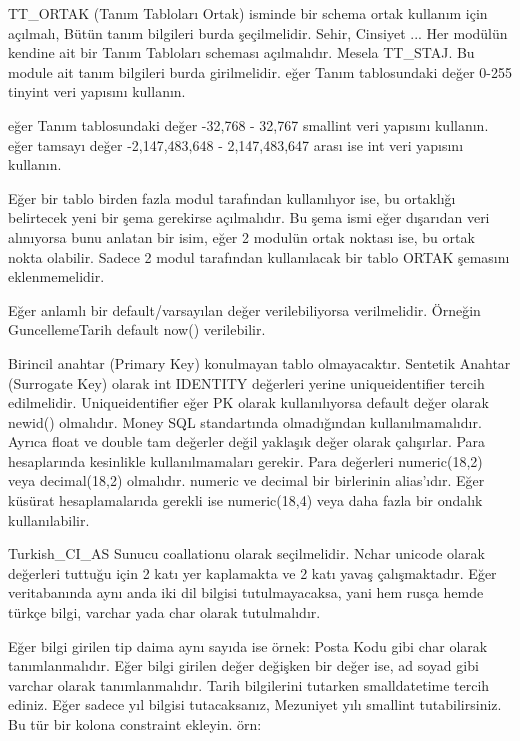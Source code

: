 \documentclass[10pt,a4paper]{article}
\begin{document}
  			TT\_ORTAK  (Tanım Tabloları Ortak) isminde bir schema ortak kullanım 
  için açılmalı, Bütün tanım bilgileri burda şeçilmelidir. 			Sehir, Cinsiyet 
  ...		 
  			Her modülün kendine ait bir Tanım Tabloları scheması açılmalıdır. 
  Mesela TT\_STAJ. Bu module ait tanım bilgileri burda girilmelidir. 		 
   eğer Tanım tablosundaki değer 0-255  tinyint veri yapısını kullanın.
  		 
   eğer Tanım tablosundaki değer  -32,768 - 32,767   smallint veri yapısını 
  kullanın.		 
   eğer tamsayı değer  -2,147,483,648 - 2,147,483,647 arası ise int veri 
  yapısını kullanın.		 
  
  
  			Eğer bir tablo birden fazla modul tarafından kullanılıyor ise, 
  bu ortaklığı belirtecek yeni bir şema gerekirse açılmalıdır. 
  Bu şema ismi eğer dışarıdan veri alınıyorsa bunu anlatan bir isim,
  eğer 2 modulün ortak noktası ise, bu ortak nokta olabilir.
  Sadece 2 modul tarafından kullanılacak bir tablo ORTAK şemasını eklenmemelidir.
  
  
  
  
  			Eğer anlamlı bir default/varsayılan değer verilebiliyorsa verilmelidir.
    Örneğin GuncellemeTarih default now() verilebilir.
  
  			Birincil anahtar (Primary Key) konulmayan tablo olmayacaktır.		 
  			Sentetik Anahtar (Surrogate Key) olarak int IDENTITY değerleri yerine 
  uniqueidentifier tercih edilmelidir.		 
  			Uniqueidentifier eğer PK olarak kullanılıyorsa default değer olarak 
  newid() olmalıdır.		 
  			 Money SQL standartında olmadığından kullanılmamalıdır. Ayrıca float ve 
  double tam değerler değil 			 yaklaşık değer olarak çalışırlar. Para 
  hesaplarında kesinlikle kullanılmamaları gerekir.		 
  			Para değerleri numeric(18,2) veya decimal(18,2) olmalıdır.	
  numeric ve decimal bir birlerinin alias'ıdır. 
    Eğer küsürat hesaplamalarıda gerekli ise numeric(18,4) veya daha fazla
    bir ondalık kullanılabilir.

  
  			Turkish\_CI\_AS Sunucu coallationu olarak seçilmelidir. Nchar unicode 
  olarak değerleri tuttuğu için 	2 katı yer kaplamakta ve 2 katı yavaş 
  çalışmaktadır. Eğer veritabanında aynı anda iki dil bilgisi tutulmayacaksa, 
  yani			hem rusça hemde türkçe bilgi,  varchar yada char olarak tutulmalıdır.
  		 
 Eğer bilgi girilen tip daima aynı sayıda ise örnek: Posta Kodu gibi 
  char olarak tanımlanmalıdır.		 
  			Eğer bilgi girilen değer değişken bir değer ise, ad soyad gibi varchar 
  olarak tanımlanmalıdır.		 
  			Tarih bilgilerini tutarken smalldatetime tercih ediniz. 			
  Eğer sadece 
  yıl bilgisi tutacaksanız, Mezuniyet yılı smallint tutabilirsiniz. Bu tür bir 
  kolona constraint ekleyin.			örn: 
  
\end{document}
